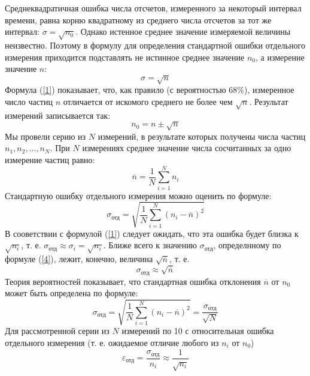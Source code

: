 \documentclass[a4paper,12pt]{article} %
\begin{document}
Среднеквадратичная ошибка числа отсчетов, измеренного за некоторый интервал времени, равна корню квадратному из среднего числа отсчетов за тот же интервал: $\sigma = \sqrt{n_0}$. Однако истенное среднее значение измеряемой величины неизвестно. Поэтому в формулу для определения стандартной ошибки отдельного измерения приходится подставлять не истинное среднее значение $n_0$, а измерение значение $n$:
\begin{equation}
\label{1}
\sigma = \sqrt{n}
\end{equation}
Формула (\ref{1}) показывает, что, как правило (с вероятностью $68\%$), измеренное число частиц $n$ отличается от искомого среднего не более чем $\sqrt{n}$. Результат измерений записывается так:
\begin{equation}
\label{2}
n_0 = n \pm \sqrt{n}
\end{equation}
Мы провели серию из $N$ измерений, в результате которых получены числа частиц $n_1, n_2, ..., n_N$. При $N$  измерениях среднее значение числа сосчитанных за одно измерение частиц равно:
\begin{equation}
\label{3}
\overline{n} = \frac{1}{N}\sum_{i=1}^{N}n_i
\end{equation}
Стандартную ошибку отдельного измерения можно оценить по формуле:
\begin{equation}
\label{4}
\sigma_\text{отд} = \sqrt{\frac{1}{N}\sum_{i=1}^{N}(n_i-\overline{n})^2}
\end{equation}
В сооветствии с формулой (\ref{1}) следует ожидать, что эта ошибка будет близка к $\sqrt{n_i}$, т. е. $\sigma_\text{отд}\approx\sigma_i=\sqrt{n_i}$. 
Ближе всего к значению $\sigma_\text{отд}$, определнному по формуле (\ref{4}), лежит, конечно, величина  $\sqrt{\overline{n}}$, т. е.
\begin{equation}
\label{5}
\sigma_\text{отд} \approx \sqrt{\overline{n}}
\end{equation}
Теория вероятностей показывает, что стандартная ошибка отклонения $\overline{n}$ от $n_0$ может быть определена по формуле:
\begin{equation}
\label{6}
\sigma_\text{отд} = \sqrt{\frac{1}{N}\sum_{i=1}^{N}(n_i-\overline{n})^2} = \frac{\sigma_\text{отд}}{\sqrt{N}}
\end{equation}
Для рассмотренной серии из $N$ измерений по 10 с относительная ошибка отдельного измерения (т. е. ожидаемое отличие любого из $n_i$ от $n_0$)
\begin{equation}
\label{7}
\varepsilon_\text{отд} = \frac{\sigma_\text{отд}}{n_i} \approx \frac{1}{\sqrt{n_i}}
\end{equation}
\end{document}
